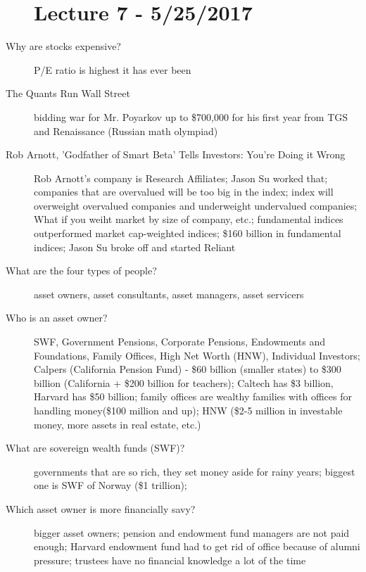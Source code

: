 \documentclass[11pt]{article}
\begin{document}
\begin{description}
\section{Lecture 7 - 5/25/2017}
\item[Why are stocks expensive?]
  P/E ratio is highest it has ever been
\item[The Quants Run Wall Street]
  bidding war for Mr. Poyarkov up to \$700,000 for his first year from TGS and Renaissance (Russian math olympiad)
\item[Rob Arnott, 'Godfather of Smart Beta' Tells Investors: You're Doing it Wrong]
  Rob Arnott's company is Research Affiliates;
  Jason Su worked that;
  companies that are overvalued will be too big in the index;
  index will overweight overvalued companies and underweight undervalued companies;
  What if you weiht market by size of company, etc.;
  fundamental indices outperformed market cap-weighted indices;
  \$160 billion in fundamental indices;
  Jason Su broke off and started Reliant
\item[What are the four types of people?]
  asset owners, asset consultants, asset managers, asset servicers
\item[Who is an asset owner?]
  SWF, Government Pensions, Corporate Pensions, Endowments and Foundations, Family Offices, High Net Worth (HNW), Individual Investors;
  Calpers (California Pension Fund) - \$60 billion (smaller states) to \$300 billion (California + \$200 billion for teachers);
  Caltech has \$3 billion, Harvard has \$50 billion;
  family offices are wealthy families with offices for handling money(\$100 million and up);
  HNW (\$2-5 million in investable money, more assets in real estate, etc.)
\item[What are sovereign wealth funds (SWF)?]
  governments that are so rich, they set money aside for rainy years;
  biggest one is SWF of Norway (\$1 trillion);
\item[Which asset owner is more financially savy?]
  bigger asset owners;
  pension and endowment fund managers are not paid enough;
  Harvard endowment fund had to get rid of office because of alumni pressure;
  trustees have no financial knowledge a lot of the time
\end{description}
\end{document}
